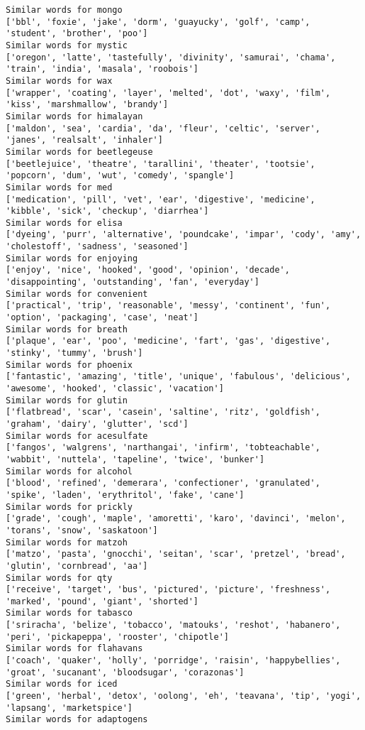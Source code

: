 \documentclass[11pt]{article}
\begin{document}
\begin{Verbatim}[commandchars=\\\{\}]
Similar words for mongo
['bbl', 'foxie', 'jake', 'dorm', 'guayucky', 'golf', 'camp', 'student', 'brother', 'poo']
Similar words for mystic
['oregon', 'latte', 'tastefully', 'divinity', 'samurai', 'chama', 'train', 'india', 'masala', 'roobois']
Similar words for wax
['wrapper', 'coating', 'layer', 'melted', 'dot', 'waxy', 'film', 'kiss', 'marshmallow', 'brandy']
Similar words for himalayan
['maldon', 'sea', 'cardia', 'da', 'fleur', 'celtic', 'server', 'janes', 'realsalt', 'inhaler']
Similar words for beetlegeuse
['beetlejuice', 'theatre', 'tarallini', 'theater', 'tootsie', 'popcorn', 'dum', 'wut', 'comedy', 'spangle']
Similar words for med
['medication', 'pill', 'vet', 'ear', 'digestive', 'medicine', 'kibble', 'sick', 'checkup', 'diarrhea']
Similar words for elisa
['dyeing', 'purr', 'alternative', 'poundcake', 'impar', 'cody', 'amy', 'cholestoff', 'sadness', 'seasoned']
Similar words for enjoying
['enjoy', 'nice', 'hooked', 'good', 'opinion', 'decade', 'disappointing', 'outstanding', 'fan', 'everyday']
Similar words for convenient
['practical', 'trip', 'reasonable', 'messy', 'continent', 'fun', 'option', 'packaging', 'case', 'neat']
Similar words for breath
['plaque', 'ear', 'poo', 'medicine', 'fart', 'gas', 'digestive', 'stinky', 'tummy', 'brush']
Similar words for phoenix
['fantastic', 'amazing', 'title', 'unique', 'fabulous', 'delicious', 'awesome', 'hooked', 'classic', 'vacation']
Similar words for glutin
['flatbread', 'scar', 'casein', 'saltine', 'ritz', 'goldfish', 'graham', 'dairy', 'glutter', 'scd']
Similar words for acesulfate
['fangos', 'walgrens', 'narthangai', 'infirm', 'tobteachable', 'wabbit', 'nuttela', 'tapeline', 'twice', 'bunker']
Similar words for alcohol
['blood', 'refined', 'demerara', 'confectioner', 'granulated', 'spike', 'laden', 'erythritol', 'fake', 'cane']
Similar words for prickly
['grade', 'cough', 'maple', 'amoretti', 'karo', 'davinci', 'melon', 'torans', 'snow', 'saskatoon']
Similar words for matzoh
['matzo', 'pasta', 'gnocchi', 'seitan', 'scar', 'pretzel', 'bread', 'glutin', 'cornbread', 'aa']
Similar words for qty
['receive', 'target', 'bus', 'pictured', 'picture', 'freshness', 'marked', 'pound', 'giant', 'shorted']
Similar words for tabasco
['sriracha', 'belize', 'tobacco', 'matouks', 'reshot', 'habanero', 'peri', 'pickapeppa', 'rooster', 'chipotle']
Similar words for flahavans
['coach', 'quaker', 'holly', 'porridge', 'raisin', 'happybellies', 'groat', 'sucanant', 'bloodsugar', 'corazonas']
Similar words for iced
['green', 'herbal', 'detox', 'oolong', 'eh', 'teavana', 'tip', 'yogi', 'lapsang', 'marketspice']
Similar words for adaptogens

\end{Verbatim}
\end{document}
